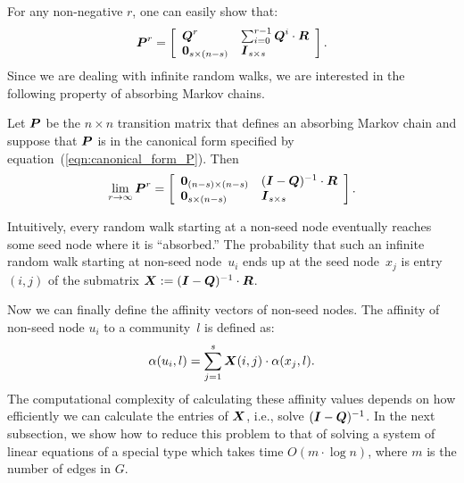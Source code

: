 For any non-negative $r$, one can easily show that:
\begin{equation}\label{exp:rth_product_of_P}
	\boldsymbol{P}^r = \left [ \begin{array}{ll}
						\boldsymbol{Q}^r  					& \sum_{i = 0}^{r - 1}\boldsymbol{Q}^i \cdot \boldsymbol{R} \\
						 \boldsymbol{0}_{s \times (n - s)} & \boldsymbol{I}_{s \times s}
						\end{array}
				\right ].
\end{equation}  
Since we are dealing with infinite random walks, we are interested in the following 
property of absorbing Markov chains.
\begin{proposition}\label{prop:limiting_Q}
	Let $\boldsymbol{P}$ be the $n \times n$ transition matrix that defines an absorbing Markov chain
	and suppose that $\boldsymbol{P}$ is in the canonical form specified by equation~(\ref{eqn:canonical_form_P}). 
	Then
    \begin{equation}
        \lim_{r \to \infty} \boldsymbol{P}^r = \left [ \begin{array}{ll}
            \boldsymbol{0}_{(n - s) \times (n - s)} & (\boldsymbol{I} - \boldsymbol{Q})^{-1} \cdot \boldsymbol{R} \\
            \boldsymbol{0}_{s \times (n - s)}       & \boldsymbol{I}_{s \times s}
        \end{array}
        \right ].
    \end{equation}  
\end{proposition}
Intuitively, every random walk starting at a non-seed node eventually 
reaches some seed node where it is ``absorbed.'' The probability 
that such an infinite random walk starting at non-seed node~$u_i$ ends 
up at the seed node~$x_j$ is entry $(i, j)$ of the 
submatrix $\boldsymbol{X} := (\boldsymbol{I} - \boldsymbol{Q})^{-1} \cdot \boldsymbol{R}$. 

Now we can finally define the affinity vectors of non-seed nodes.
The affinity of non-seed node $u_i$ to a community~$l$ is defined as:
\begin{equation}\label{eqn:belonging_vector}
    \alpha (u_i, l) = \sum_{j = 1}^{s} \boldsymbol{X} (i, j) \cdot \alpha (x_j, l).
\end{equation}
The computational complexity of calculating these affinity values  
depends on how efficiently we can calculate the entries of $\boldsymbol{X}$, 
i.e., solve $(\boldsymbol{I} - \boldsymbol{Q})^{-1}$. In the next subsection, we show 
how to reduce this problem to that of solving a system of linear equations 
of a special type which takes time $O(m \cdot \log n)$, where $m$
is the number of edges in $G$.

